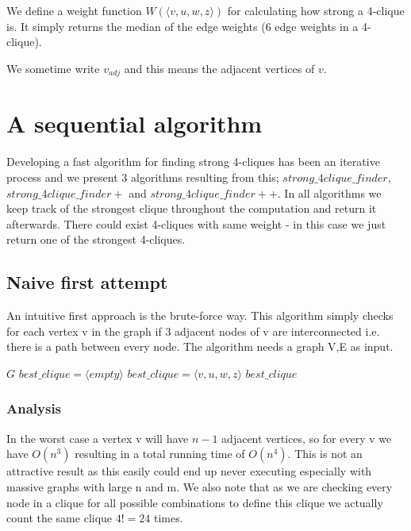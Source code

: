 \documentclass{article}
\begin{document}
We define a weight function $W(\langle v,u,w,z\rangle )$ for calculating how strong a 4-clique is. It simply returns the median of the edge weights (6 edge weights in a 4-clique).

We sometime write $v_{adj}$ and this means the adjacent vertices of $v$.



\section{A sequential algorithm}
Developing a fast algorithm for finding strong 4-cliques has been an iterative process and we present 3 algorithms resulting from this; $strong\_4clique\_finder$, $strong\_4clique\_finder+$ and $strong\_4clique\_finder++$. In all algorithms we keep track of the strongest clique throughout the computation and return it afterwards. There could exist 4-cliques with same weight - in this case we just return one of the strongest 4-cliques.

\subsection{Naive first attempt}
An intuitive first approach is the brute-force way. This algorithm simply checks for each vertex v in the graph if 3 adjacent nodes of v are interconnected i.e. there is a path between every node. The algorithm needs a graph V,E as input.

\begin{algorithm}
\caption{$strong\_4clique\_finder$}
\begin{algorithmic}
\REQUIRE $G$
\STATE $best\_clique = \langle empty\rangle $
							\STATE $best\_clique = \langle v,u,w,z\rangle $
						\ENDIF
					\ENDIF
				\ENDFOR
			\ENDIF
		\ENDFOR
	\ENDFOR
\ENDFOR
\RETURN $best\_clique$
\end{algorithmic}
\label{fig 2 : Strong 4 Clique finder}
\end{algorithm}

\subsubsection{Analysis}
In the worst case a vertex v will have $n-1$ adjacent vertices, so for every v we have $O(n^{3})$ resulting in a total running time of $O(n^{4})$. This is not an attractive result as this easily could end up never executing especially with massive graphs with large n and m. We also note that as we are checking every node in a clique for all possible combinations to define this clique we actually count the same clique $4! = 24$ times.
\end{document}
